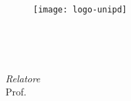 \frontmatter
\begin{titlepage}

\begin{center}

\begin{LARGE}
\textbf{\myUni}\\
\end{LARGE}

\vspace{10pt}

\begin{Large}
\textsc{\myDepartment}\\
\end{Large}

\vspace{10pt}

\begin{large}
\textsc{\myFaculty}\\
\end{large}

\vspace{30pt}
\begin{figure}[htbp]
\begin{center}
\texttt{[image: logo-unipd]}
\end{center}
\end{figure}
\vspace{30pt}

\begin{Large}
\begin{center}
\textbf{\myTitle}\\
\end{center}
\end{Large}

\vspace{10pt}

\begin{large}
\textsl{\myDegree}\\
\end{large}

\vspace{40pt}

\begin{large}
\begin{flushleft}
\textit{Relatore}\\
\vspace{5pt}
Prof. \myProf
\end{flushleft}


\end{large}
\end{center}
\end{titlepage}
